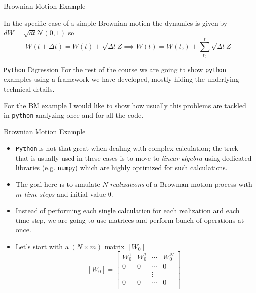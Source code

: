 \documentclass{beamer}
\begin{document}
\begin{frame}[fragile]{Brownian Motion Example}

In the specific case of a simple Brownian motion the dynamics is given by $dW = \sqrt{dt}\mathcal{N}(0,1)$ so
\begin{equation}
W(t+\Delta t) = W(t) + \sqrt{\Delta t}Z \implies
W(t) = W(t_0) + \sum_{t_0}^{t} \sqrt{\Delta t}Z
\label{eq:bm_evolution}
\end{equation}

\begin{block}{\texttt{Python} Digression}
For the rest of the course we are going to show \texttt{python} examples using a framework we have developed, mostly hiding the underlying technical details.

For the BM example I would like to show how usually this problems are tackled in \texttt{python} analyzing once and for all the code.
\end{block}
\end{frame}

\begin{frame}{Brownian Motion Example}
\begin{itemize}
    \item \texttt{Python} is not that great when dealing with complex calculation; the trick that is usually used in these cases is to move to \emph{linear algebra} using dedicated libraries (e.g. \texttt{numpy}) which are highly optimized for such calculations.
    \item The goal here is to simulate $N$ \emph{realizations} of a Brownian motion process with $m$ \textit{time steps} and initial value 0. 
    \item Instead of performing each single calculation for each realization and each time step, we are going to use matrices and perform bunch of operations at once.
    \item Let's start with a $(N\times m)$ matrix $[W_0]$
    $$
    [W_0] =
    \begin{bmatrix}
    W^1_0 & W^2_0 & \cdots & W^N_0 \\
    0 & 0 & \cdots & 0 \\
     &  & \vdots &   \\
    0 & 0 & \cdots & 0 \\
    \end{bmatrix}
    $$
    \end{itemize}
\end{frame}
\end{document}
